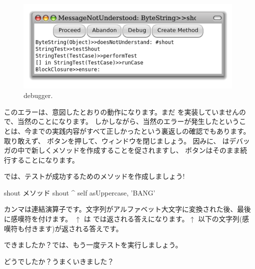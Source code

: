 \documentclass[a4paper,10pt,twoside]{book}
\begin{document}
\begin{figure}[hbt]
\centerline {\includegraphics[width=\textwidth]{Predebugger}}
\caption{debugger.}
\end{figure}

このエラーは、意図したとおりの動作になります。まだ  を実装していませんので、当然のことになります。
しかしながら、当然のエラーが発生したということは、今までの実践内容がすべて正しかったという裏返しの確認でもあります。
取り敢えず、 ボタンを押して、ウィンドウを閉じましょう。
因みに、 はデバッガの中で新しくメソッドを作成することを促されますし、 ボタンはそのまま続行することになります。

では、テストが成功するためのメソッドを作成しましょう!

\begin{method}[shout]{shout メソッド}
shout
	^ self asUppercase, 'BANG'
\end{method}

カンマは連結演算子です。文字列がアルファベット大文字に変換された後、最後に感嘆符を付けます。
$\uparrow$ は \pharo では返される答えになります。$\uparrow$ 以下の文字列(感嘆符も付きます)が返される答えです。

できましたか？では、もう一度テストを実行しましょう。

どうでしたか？うまくいきました？
\end{document}
